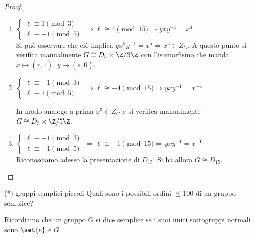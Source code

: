 \begin{proof}
\begin{enumerate}
        Quindi il gruppo è abeliano, ovvero $G \cong \grp{x} \times \grp{y} \cong \Z/2\Z \times \Z/15\Z \cong \Z/30\Z$.
        
        \item
        $\begin{cases}
        \ell \equiv  1 \pmod{3} \\
        \ell \equiv  -1 \pmod{5} 
        \end{cases}$  $\Rightarrow \ell \cong 4 \pmod{15} \Rightarrow yxy^{-1} = x^4$ \\
        Si può osservare che ciò implica $yx^5y^{-1} = x^5  \Rightarrow x^5 \in Z_G$. 
        A questo punto si verifica manualmente $G \cong D_5 \times \Z/3\Z$ con l'isomorfismo che manda $x \mapsto (r,\overline{1})$, $y \mapsto (s,\overline{0})$.
        
        \item
        $\begin{cases}
        \ell \equiv  -1 \pmod{3} \\
        \ell \equiv  1 \pmod{5} 
        \end{cases}$  $\Rightarrow \ell \cong -4 \pmod{15} \Rightarrow yxy^{-1} = x^{-4}$
        
        In modo analogo a prima $x^3 \in Z_G$ e si verifica manualmente $G \cong D_3 \times \Z/5\Z$.
        
        \item
        $\begin{cases}
        \ell \equiv  -1 \pmod{3} \\
        \ell \equiv  -1 \pmod{5} 
        \end{cases}$ $\Rightarrow \ell \cong -1 \pmod{15} \Rightarrow yxy^{-1} = x^{-1}$ \\ Riconosciamo adesso la presentazione di $D_{15}$. Si ha allora $G \cong D_{15}$. 
    \end{enumerate}
\end{proof}
\begin{example2}{(*) gruppi semplici piccoli}
    Quali sono i possibili ordini $\leq 100$ di un gruppo semplice?

    Ricordiamo che un gruppo $G$ si dice semplice se i suoi unici sottogruppi normali sono $\set{e}$ e $G$. 
\end{example2}
